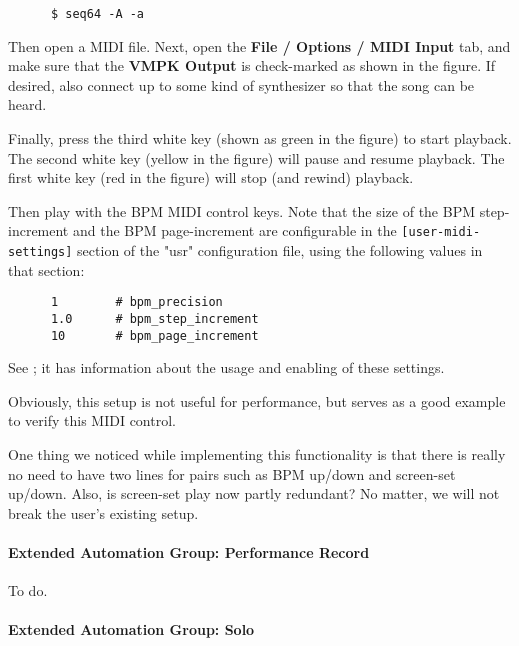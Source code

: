    \begin{verbatim}
      $ seq64 -A -a
   \end{verbatim}
   
   Then open a MIDI file.  Next,
   open the \textbf{File / Options / MIDI Input} tab, and make sure that
   the \textbf{VMPK Output} is check-marked as shown in the figure.
   If desired, also connect up to some kind of synthesizer so that the song can
   be heard.

   Finally, press the third white key (shown as green in the figure) to start
   playback.  The second white key (yellow in the figure) will pause and resume
   playback.  The first white key (red in the figure) will stop (and rewind)
   playback.

   Then play with the BPM MIDI control keys.  Note that the size of the
   BPM step-increment and the BPM page-increment are configurable in the
   \texttt{[user-midi-settings]} section of the "usr" configuration file,
   using the following values in that section:

   \begin{verbatim}
      1        # bpm_precision
      1.0      # bpm_step_increment
      10       # bpm_page_increment
   \end{verbatim}

   See ; it has
   information about the usage and enabling of these settings.

   Obviously, this setup is not useful for performance, but serves as a good
   example to verify this MIDI control.

   One thing we noticed while implementing this functionality is that there
   is really no need to have two lines for pairs such as BPM up/down and
   screen-set up/down.  Also, is screen-set play now partly redundant?
   No matter, we will not break the user's existing setup.

\paragraph{Extended Automation Group: Performance Record}
\label{paragraph:seq64_rc_file_midi_ctrl_ex_precord}

   To do.

\paragraph{Extended Automation Group: Solo}
\label{paragraph:seq64_rc_file_midi_ctrl_ex_solo}

